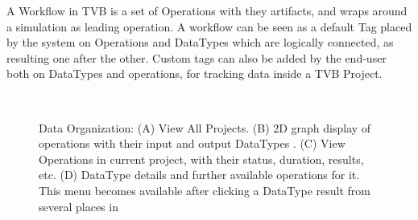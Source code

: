 A Workflow in TVB is a set of Operations with they artifacts, and wraps around a simulation as leading operation.
A workflow can be seen as a default Tag placed by the system on Operations and DataTypes which are logically connected, as resulting one after the other.
Custom tags can also be added by the end-user both on DataTypes and operations, for tracking data inside a TVB Project.
	
 \begin{figure}
 	\centering
	\qquad
	\\
	\qquad
	\caption{\TVB Data Organization: 
	(A) View All Projects.
	(B) 2D graph display of operations with their input and output DataTypes .
	(C) View Operations in current project, with their status, duration, results, etc.
	(D) DataType details and further available operations for it. This menu becomes available after clicking a DataType result from several places in \TVB }
        \label{fig:project}
\end{figure}

